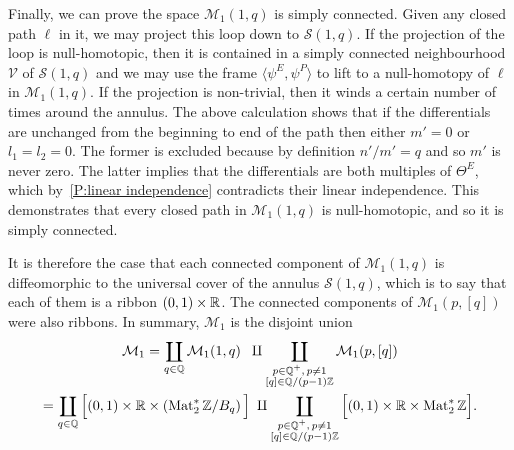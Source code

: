 \documentclass{article}
\begin{document}
Finally, we can prove the space $\mathcal{M}_1(1,q)$ is simply connected. Given any closed path $\ell$ in it, we may project this loop down to $\mathcal{S}(1,q)$. If the projection of the loop is null-homotopic, then it is contained in a simply connected neighbourhood $\mathcal{V}$ of $\mathcal{S}(1,q)$ and we may use the frame $\langle \psi^E,\psi^P \rangle$ to lift to a null-homotopy of $\ell$ in $\mathcal{M}_1(1,q)$. If the projection is non-trivial, then it winds a certain number of times around the annulus. The above calculation shows that if the differentials are unchanged from the beginning to end of the path then either $m' = 0$ or $l_1=l_2 = 0$. The former is excluded because by definition $n'/m' = q$ and so $m'$ is never zero. The latter implies that the differentials are both multiples of $\Theta^E$, which by~\ref{P:linear independence} contradicts their linear independence. This demonstrates that every closed path in $\mathcal{M}_1(1,q)$ is null-homotopic, and so it is simply connected.

It is therefore the case that each connected component of $\mathcal{M}_1(1,q)$ is diffeomorphic to the universal cover of the annulus $\mathcal{S}(1,q)$, which is to say that each of them is a ribbon $(0,1)\times \mathbb{R}$. The connected components of $\mathcal{M}_1(p,[q])$ were also ribbons. In summary, $\mathcal{M}_1$ is the disjoint union
\begin{gather*}
\mathcal{M}_1
=
\coprod_{q \in \mathbb{Q}} \mathcal{M}_1(1,q)
\;\;\amalg \coprod_{\substack{p \in \mathbb{Q}^+,\, p \neq 1\\ [q] \in \mathbb{Q}/(p-1)\mathbb{Z}}}
\mathcal{M}_1(p,[q]) \\
=
\coprod_{q \in \mathbb{Q}} \Big[ (0,1)\times\mathbb{R} \times \left(\operatorname{Mat}_2^*\mathbb{Z} / B_q\right) \Big]
\;\amalg
\coprod_{\substack{p \in \mathbb{Q}^+,\, p \neq 1\\ [q] \in \mathbb{Q}/(p-1)\mathbb{Z}}}
\Big[ (0,1)\times\mathbb{R} \times \operatorname{Mat}_2^*\mathbb{Z} \Big].
\end{gather*}
\end{document}
